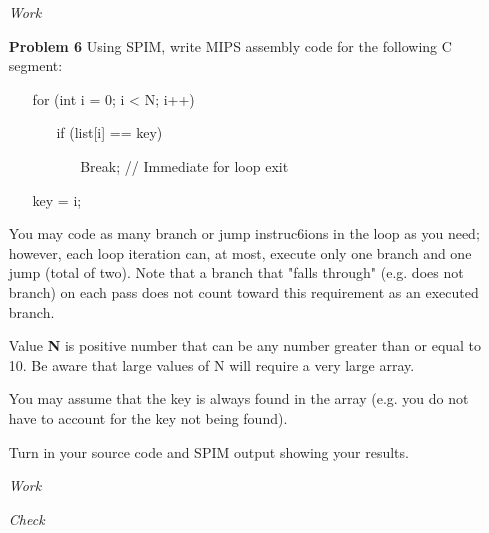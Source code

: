 \documentclass[12pt]{article}
\begin{document}
\begin{enumerate}
  \item[\textit{Work}]
\end{enumerate}






\begin{enumerate}
  \item[\textbf{Problem 6}] Using SPIM, write MIPS assembly code for the following C segment:
  \begin{enumerate}\ttfamily
    \item[] for (int i = 0; i < N; i++)
    \begin{enumerate}
      \item[] if (list[i] == key)
      \begin{enumerate}
        \item[] Break; // Immediate for loop exit
      \end{enumerate}
    \end{enumerate}
    \item[] key = i;
  \end{enumerate}

  \item[] You may code as many branch or jump instruc6ions in the loop as you need; however, each loop iteration can, at most, execute only one branch and one jump (total of two). Note that a branch that "falls through" (e.g. does not branch) on each pass does not count toward this requirement as an executed branch.

  \item[] Value \textbf{N} is positive number that can be any number greater than or equal to 10. Be aware that large values of N will require a very large array.

  \item[] You may assume that the key is always found in the array (e.g. you do not have to account for the key not being found).

	\item[] Turn in your source code and SPIM output showing your results.
\end{enumerate}

\begin{enumerate}
  \item[\textit{Work}]
  \item[\textit{Check}]
\end{enumerate}
\end{document}
